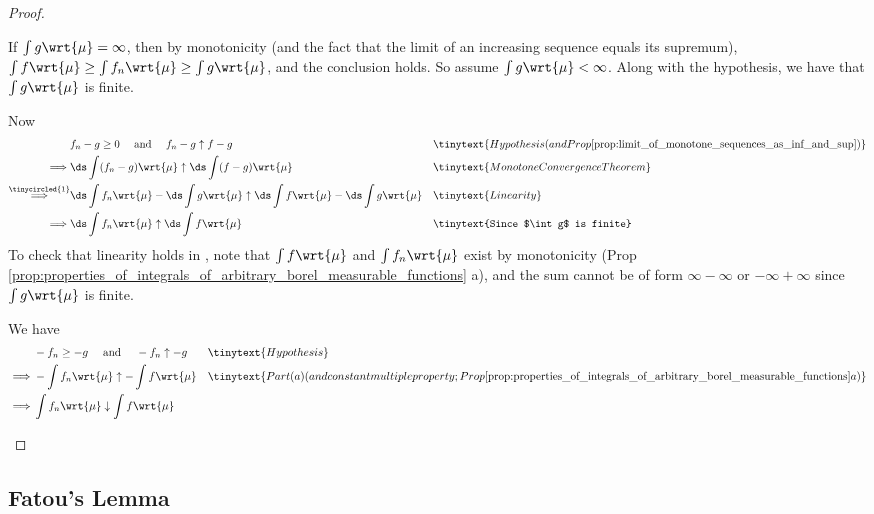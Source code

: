 \documentclass{article} %
\newcommand{\dint}{\ds\int}
\newcommand{\dmu}{\wrt{\mu}}
\begin{document}
\begin{proof}
\begin{alphabate}
\item If $\int g \dmu = \infty$, then by monotonicity {\tiny (and the fact that the limit of an increasing sequence equals its supremum)}, $\int f \dmu \geq \int f_n \dmu \geq \int g \dmu$, and the conclusion holds.  So assume $\int g \dmu < \infty$.  Along with the hypothesis, we have that $\int g \dmu$ is finite.

Now
\begin{align*}
& f_n - g \geq 0 \quad \text{ and } \quad f_n -g \uparrow f-g && \tinytext{Hypothesis (and Prop \ref{prop:limit_of_monotone_sequences_as_inf_and_sup})} \\
\implies & \ds\int (f_n - g) \dmu \uparrow \ds\int (f-g) \dmu && \tinytext{Monotone Convergence Theorem}\\
\stackrel{\tinycircled{1}}{\implies} & \ds\int f_n \dmu - \ds\int g \dmu \uparrow \ds\int f \dmu - \ds\int g \dmu && \tinytext{Linearity}\\
\implies & \dint f_n \dmu \uparrow \dint f \dmu && \tinytext{Since $\int g$ is finite} 
\end{align*}	
To check that linearity holds in , note that $\int f \dmu$ and $\int f_n \dmu$ exist by monotonicity (Prop \ref{prop:properties_of_integrals_of_arbitrary_borel_measurable_functions} a), and the sum cannot be of form $\infty - \infty$ or $-\infty + \infty$ since $\int g \dmu$ is finite.
\item We have
\begin{align*}
& -f_n \geq -g \quad \text{ and } \quad -f_n \uparrow -g && \tinytext{Hypothesis} \\
\implies & - \int f_n \dmu \uparrow - \int f \dmu && \tinytext{Part (a) (and constant multiple property; Prop \ref{prop:properties_of_integrals_of_arbitrary_borel_measurable_functions} a) } \\
\implies & \int f_n \dmu \downarrow  \int f \dmu
\end{align*} 
\end{alphabate}
\end{proof}




\subsection{Fatou's Lemma}
\end{document}
